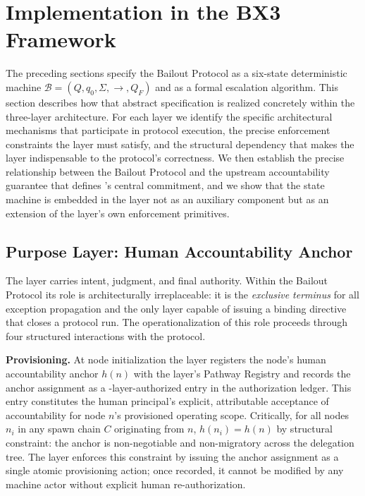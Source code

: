 \section{Implementation in the BX3 Framework}\label{sec:implementation}

The preceding sections specify the Bailout Protocol as a six-state deterministic machine
$\mathcal{B} = (Q, q_0, \Sigma, \rightarrow, Q_F)$ and as a formal escalation algorithm.
This section describes how that abstract specification is realized concretely within the
\bxthree{} three-layer architecture. For each layer we identify the specific architectural
mechanisms that participate in protocol execution, the precise enforcement constraints
the layer must satisfy, and the structural dependency that makes the layer indispensable
to the protocol's correctness. We then establish the precise relationship between the
Bailout Protocol and the upstream accountability guarantee that defines \bxthree's
central commitment, and we show that the state machine is embedded in the \fact{} layer
not as an auxiliary component but as an extension of the \fact{} layer's own enforcement
primitives.

\subsection{Purpose Layer: Human Accountability Anchor}\label{sec:purpose-layer}

The \purpose{} layer carries intent, judgment, and final authority. Within the Bailout
Protocol its role is architecturally irreplaceable: it is the \emph{exclusive terminus}
for all exception propagation and the only layer capable of issuing a binding directive
that closes a protocol run. The operationalization of this role proceeds through four
structured interactions with the protocol.

\medskip\noindent\textbf{Provisioning.} At node initialization the \purpose{} layer
registers the node's human accountability anchor $h(n)$ with the \fact{} layer's Pathway
Registry and records the anchor assignment as a \purpose-layer-authorized entry in the
authorization ledger. This entry constitutes the human principal's explicit, attributable
acceptance of accountability for node $n$'s provisioned operating scope. Critically, for
all nodes $n_i$ in any spawn chain $C$ originating from $n$, $h(n_i) = h(n)$ by structural
constraint: the anchor is non-negotiable and non-migratory across the delegation tree.
The \purpose{} layer enforces this constraint by issuing the anchor assignment as a
single atomic provisioning action; once recorded, it cannot be modified by any machine
actor without explicit human re-authorization.

